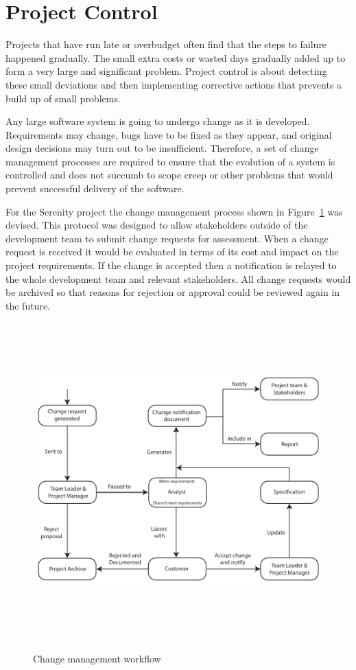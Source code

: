 \section{Project Control}
\label{sec:control}


Projects that have run late or overbudget often find that the steps to failure happened gradually.
The small extra costs or wasted days gradually added up to form a very large and significant
problem. Project control is about detecting these small deviations and then implementing corrective
actions that prevents a build up of small problems.

Any large software system is going to undergo change as it is developed. Requirements may change,
bugs have to be fixed as they appear, and original design decisions may turn out to be insufficient.
Therefore, a set of change management processes are required to ensure that the evolution of a
system is controlled and does not succumb to scope creep or other problems that would prevent
successful delivery of the software.

For the Serenity project the change management process shown in Figure~\ref{fig:change_management}
was devised. This protocol was designed to allow stakeholders outside of the development team
to submit change requests for assessment. When a change request is received it would be evaluated
in terms of its cost and impact on the project requirements. If the change is accepted then a
notification is relayed to the whole development team and relevant stakeholders. All change requests
would be archived so that reasons for rejection or approval could be reviewed again in the future.

\begin{figure}
	\includegraphics[height=33em]{res/change_management_diagram}
	\label{fig:change_management}
	\caption{Change management workflow}
\end{figure}

